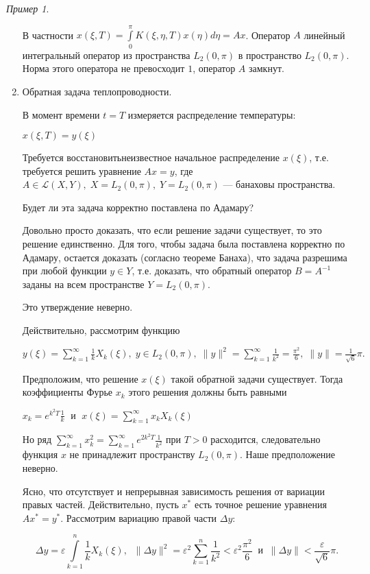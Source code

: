 \documentclass[12pt,a4paper,titlepage,oneside]{book}
\theoremstyle{definition}
\theoremstyle{plain}
\theoremstyle{remark}
\theoremstyle{remark}
\newtheorem*{example}{Пример}
\theoremstyle{remark}
\theoremstyle{remark}
\theoremstyle{plain}
\theoremstyle{plain}
\begin{document}
\begin{example}
\begin{enumerate}
В частности $x(\xi,T) = \displaystyle\int\limits_0^\pi K(\xi, \eta, T) x(\eta)d\eta = Ax$. Оператор $A$ линейный интегральный оператор из пространства $L_2(0, \pi)$ в пространство $L_2(0, \pi)$. Норма этого оператора не превосходит $1$, оператор $A$ замкнут.

	\item Обратная задача теплопроводности.

В момент времени $t = T$ измеряется  распределение температуры:
\begin{center}
$x(\xi, T) = y(\xi)$
\end{center}

Требуется \guillemotleft восстановить\guillemotright \;неизвестное начальное распределение $x(\xi)$, т.е. требуется решить уравнение $Ax = y$, где $A\in\mathscr{L}(X,Y), \; X = L_{2}(0, \pi), \; Y = L_{2}(0, \pi)$ --- банаховы пространства.

Будет ли эта задача корректно поставлена по Адамару?

Довольно просто доказать, что если решение задачи существует, то это решение единственно. Для того, чтобы задача была поставлена корректно по Адамару, остается доказать (согласно теореме Банаха), что задача разрешима при любой функции $y \in Y$, т.е. доказать, что обратный оператор $B = A^{-1}$ заданы на всем пространстве $Y = L_{2}(0, \pi)$.

Это утверждение неверно.

Действительно, рассмотрим функцию
\begin{center}
$y(\xi)=\displaystyle\sum\limits_{k=1}^{\infty} \frac{1}{k} X_k(\xi) ,  \; y\in L_{2}(0, \pi), \; \|y\|^2 = \sum\limits_{k=1}^{\infty} \frac{1}{k^2} = \frac{\pi^2}{6} ,  \; \|y\| = \frac{1}{\sqrt{6}}\pi \mbox{.}$
\end{center}

Предположим, что решение $x(\xi)$ такой обратной задачи существует. Тогда коэффициенты Фурье $x_k$ этого решения должны быть равными
\begin{center}
$x_k=e^{k^2 T} \frac{1}{k} \; \mbox{ и } \; x(\xi) = \displaystyle\sum\limits_{k=1}^{\infty} x_k X_k(\xi)$
\end{center}

Но ряд $\displaystyle\sum\limits_{k=1}^{\infty} x_k^2 = \sum\limits_{k=1}^{\infty} e^{2k^2 T} \frac{1}{k^2}$ при $T > 0$ расходится, следовательно функция $x$ не принадлежит пространству $L_2(0,\pi)$. Наше предположение неверно.

Ясно, что отсутствует и непрерывная зависимость решения от вариации правых частей. Действительно, пусть $x^{*}$ есть точное решение уравнения $Ax^*=y^*$. Рассмотрим вариацию правой части  $\Delta y$:
\begin{center}
$$\Delta y = \varepsilon \int\limits_{k=1}^{n} \frac{1}{k} X_k(\xi) , \; \; \| \Delta y\|^2 = \varepsilon ^2 \sum\limits_{k=1}^{n} \frac{1}{k^2} < \varepsilon^2 \frac{\pi ^2}{6} \; \; \mbox{и} \; \; \| \Delta y \| < \frac{\varepsilon}{\sqrt{6}}\pi.$$
\end{center}


\end{enumerate}
\end{example}
\end{document}

